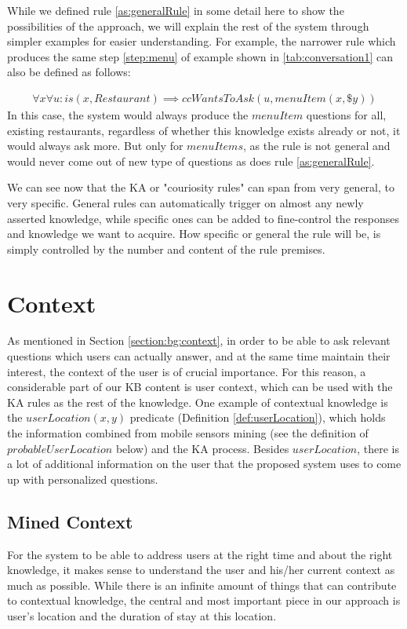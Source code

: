 While we defined rule \ref{as:generalRule} in some detail here to show the 
possibilities of the approach, we will explain the rest of the system through 
simpler examples for easier understanding. For example, the narrower rule which
produces the same step \ref{step:menu} of example shown in 
\autoref{tab:conversation1} can also be defined as follows:

\begin{equation}\label{as:specificRule}
\begin{gathered}
\forall x \forall u:is(x,Restaurant) \implies ccWantsToAsk(u,menuItem(x,\$y))
\end{gathered}
\end{equation}
In this case, the system would always produce the $menuItem$ questions for all, 
existing restaurants, regardless of whether this knowledge exists already or
not, it would always ask more. But only for $menuItems$, as the rule is not
general and would never come out of new type of questions as does rule 
\ref{as:generalRule}.

We can see now that the KA or "couriosity rules" can span from very general, to 
very specific. General rules can automatically trigger on almost any newly 
asserted knowledge, while specific ones can be added to fine-control the 
responses and knowledge we want to acquire. How specific or general the rule 
will be, is simply controlled by the number and content of the rule premises.

\section{Context}
\label{section:context}
As mentioned in Section \ref{section:bg:context}, in order to be able to ask 
relevant questions which users can actually answer, and at the same time 
maintain their interest, the context of the user is of crucial importance. For 
this reason, a considerable part of our KB content is user context, which can 
be used with the KA rules as the rest of the knowledge. One example of 
contextual knowledge is the $userLocation(x,y)$ predicate 
(Definition \ref{def:userLocation}), which holds the information combined from 
mobile 
sensors mining (see the definition of $probableUserLocation$ below) and the KA 
process. Besides $userLocation$, there is a lot of additional information on the
user that the proposed system uses to come up with personalized questions.

\subsection{Mined Context}
\label{section:minedContext}
For the system to be able to address users at the right time and about the right
knowledge, it makes sense to understand the user and his/her current context as
much as possible. While there is an infinite amount of things that can contribute
to contextual knowledge, the central and most important piece in our 
approach is user's location and the duration of stay at this location. 

